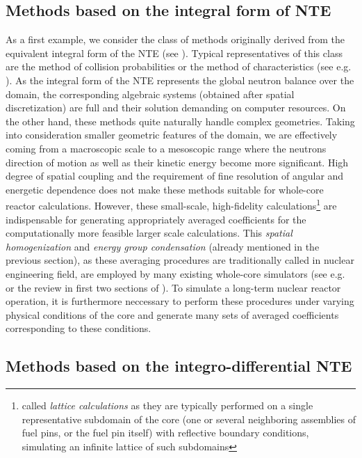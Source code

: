 \subsection{Methods based on the integral form of NTE} \label{sec:lattice}
As a first example, we consider the class of
methods originally derived from the equivalent integral form of the NTE (see ). Typical
representatives of this class are the method of collision probabilities or the method of characteristics (see e.g.
\cite{Cho2,Wu1,Hursin1,Petkov1,Sanchez1}). As the integral form of the NTE represents the global neutron balance over
the domain, the corresponding algebraic systems (obtained after spatial discretization) are full and
their solution demanding on computer resources. On the other hand, these methods quite naturally handle complex
geometries. Taking into consideration smaller geometric features of the domain, we are effectively coming from a
macroscopic scale to a mesoscopic range where the neutrons direction of motion as well as their kinetic energy become
more significant. High degree of spatial coupling and the requirement of fine resolution of angular and energetic
dependence does not make these methods suitable for whole-core reactor calculations.
However, these small-scale,
high-fidelity calculations\footnote{called \textit{lattice calculations} as they are typically performed on a single
representative subdomain of the core (one or several neighboring assemblies of fuel pins, or the fuel pin itself)
with reflective boundary conditions, simulating an infinite lattice of such subdomains} are indispensable for
generating appropriately averaged coefficients for the computationally more feasible larger scale calculations.
This \textit{spatial homogenization} and \textit{energy group condensation} (already mentioned in the previous
section), as these averaging procedures are traditionally called in nuclear engineering field, are employed by many existing whole-core simulators (see e.g.
\cite[Chap. 17]{Reuss1} or the review in first two sections of \cite{Sanchez7}). To simulate a long-term nuclear reactor
operation, it is furthermore neccessary to perform these procedures under varying physical conditions of the core and
generate many sets of averaged coefficients corresponding to these conditions.

\subsection{Methods based on the integro-differential NTE}\label{sec:idNTE} 

